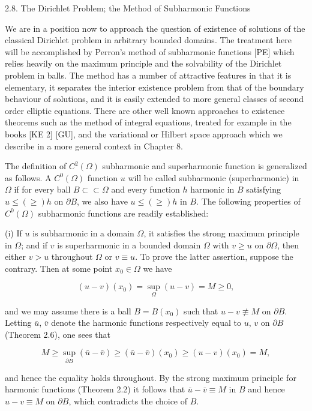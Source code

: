 2.8. The Dirichlet Problem; the Method of Subharmonic Functions

We are in a position now to approach the question of existence of solutions of the classical Dirichlet problem in arbitrary bounded domains. The treatment here will be accomplished by Perron's method of subharmonic functions [PE] which relies heavily on the maximum principle and the solvability of the Dirichlet problem in balls. The method has a number of attractive features in that it is elementary, it separates the interior existence problem from that of the boundary behaviour of solutions, and it is easily extended to more general classes of second order elliptic equations. There are other well known approaches to existence theorems such as the method of integral equations, treated for example in the books [KE 2] [GU], and the variational or Hilbert space approach which we describe in a more general context in Chapter 8.

The definition of $C^2(\Omega)$ subharmonic and superharmonic function is generalized as follows. A $C^0(\Omega)$ function $u$ will be called subharmonic (superharmonic) in $\Omega$ if for every ball $B \subset \subset \Omega$ and every function $h$ harmonic in $B$ satisfying $u \leq (\geq) h$ on $\partial B$, we also have $u \leq (\geq) h$ in $B$. The following properties of $C^0(\Omega)$ subharmonic functions are readily established:

\quad (i) If $u$ is subharmonic in a domain $\Omega$, it satisfies the strong maximum principle in $\Omega$; and if $v$ is superharmonic in a bounded domain $\Omega$ with $v \geq u$ on $\partial \Omega$, then either $v > u$ throughout $\Omega$ or $v \equiv u$. To prove the latter assertion, suppose the contrary. Then at some point $x_0 \in \Omega$ we have

\[
(u-v)(x_0)=\sup_{\Omega}(u-v)=M\geq 0,
\]


and we may assume there is a ball $B=B(x_0)$ such that $u-v\not\equiv M$ on $\partial B$. Letting $\bar u$, $\bar v$ denote the harmonic functions respectively equal to $u$, $v$ on $\partial B$ (Theorem 2.6), one sees that

\[
M \geq \sup_{\partial B}(\bar u-\bar v) \geq (\bar u-\bar v)(x_0) \geq (u-v)(x_0)=M,
\]

and hence the equality holds throughout. By the strong maximum principle for harmonic functions (Theorem 2.2) it follows that $\bar u-\bar v\equiv M$ in $B$ and hence $u-v\equiv M$ on $\partial B$, which contradicts the choice of $B$.

